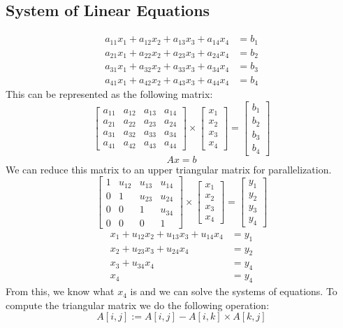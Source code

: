 \documentclass{math}
\begin{document}
\subsection*{System of Linear Equations}
\begin{align*}
  a_{11}x_1+a_{12}x_2+a_{13}x_3+a_{14}x_4 &= b_1 \\
  a_{21}x_1+a_{22}x_2+a_{23}x_3+a_{24}x_4 &= b_2 \\
  a_{31}x_1+a_{32}x_2+a_{33}x_3+a_{34}x_4 &= b_3 \\
  a_{41}x_1+a_{42}x_2+a_{43}x_3+a_{44}x_4 &= b_4
\end{align*}
This can be represented as the following matrix:
\[ \begin{bmatrix}
  a_{11} & a_{12} & a_{13} & a_{14} \\
  a_{21} & a_{22} & a_{23} & a_{24} \\
  a_{31} & a_{32} & a_{33} & a_{34} \\
  a_{41} & a_{42} & a_{43} & a_{44}
\end{bmatrix}\times\begin{bmatrix}
  x_1 \\ x_2 \\ x_3 \\ x_4
\end{bmatrix} = \begin{bmatrix}
  b_1 \\ b_2 \\ b_3 \\ b_4
\end{bmatrix} \]
\[ Ax = b \]
We can reduce this matrix to an upper triangular matrix for parallelization.
\[ \begin{bmatrix}
  1 & u_{12} & u_{13} & u_{14} \\
  0 & 1 & u_{23} & u_{24} \\
  0 & 0 & 1 & u_{34} \\
  0 & 0 & 0 & 1
\end{bmatrix}\times\begin{bmatrix}
  x_1 \\ x_2 \\ x_3 \\ x_4
\end{bmatrix} = \begin{bmatrix}
  y_1 \\ y_2 \\ y_3 \\ y_4
\end{bmatrix} \]
\begin{align*}
  x_1+u_{12}x_2+u_{13}x_3+u_{14}x_4 &= y_1 \\
  x_2+u_{23}x_3+u_{24}x_4 &= y_2 \\
  x_3+u_{34}x_4 &= y_4 \\
  x_4 &= y_4
\end{align*}
From this, we know what \( x_4 \) is and we can solve the systems of equations.
To compute the triangular matrix we do the following operation:
\[ A[i,j] := A[i,j]-A[i,k]\times A[k,j] \]
\end{document}
